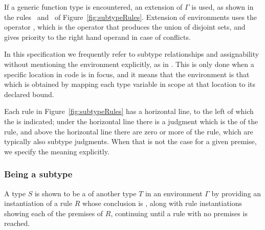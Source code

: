 \documentclass[makeidx]{article}
\begin{document}
{\LMHash{}%
If a generic function type is encountered, an extension of $\Gamma$ is used,
as shown in the rules~\SrnPositionalFunctionType{}
and~\SrnNamedFunctionType{}
of Figure~\ref{fig:subtypeRules}.
Extension of environments uses the operator \Index{$\uplus$},
which is the operator that produces the union of disjoint sets,
and gives priority to the right hand operand in case of conflicts.


\LMHash{}%
In this specification we frequently refer to
subtype relationships and assignability
without mentioning the environment explicitly,
as in .
This is only done when a specific location in code is in focus,
and it means that the environment is that which is obtained
by mapping each type variable in scope at that location
to its declared bound.

\LMHash{}%
Each rule in Figure~\ref{fig:subtypeRules} has a horizontal line,
to the left of which the  is indicated;
under the horizontal line there is a judgment which is the
of the rule,
and above the horizontal line there are zero or more
of the rule,
which are typically also subtype judgments.
When that is not the case for a given premise,
we specify the meaning explicitly.



\subsubsection{Being a subtype}

\LMHash{}%
A type $S$ is shown to be a  of another type $T$
in an environment $\Gamma$ by providing
an instantiation of a rule $R$ whose conclusion is
,
along with rule instantiations showing
each of the premises of $R$,
continuing until a rule with no premises is reached.

}
\end{document}
